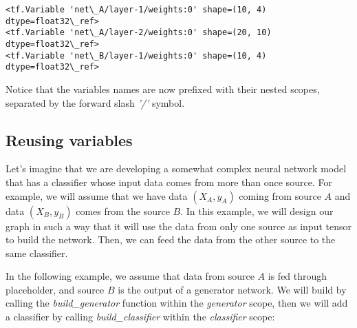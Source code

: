 \documentclass[11pt]{article}
\begin{document}
    \begin{Verbatim}[commandchars=\\\{\}]
<tf.Variable 'net\_A/layer-1/weights:0' shape=(10, 4) dtype=float32\_ref>
<tf.Variable 'net\_A/layer-2/weights:0' shape=(20, 10) dtype=float32\_ref>
<tf.Variable 'net\_B/layer-1/weights:0' shape=(10, 4) dtype=float32\_ref>

    \end{Verbatim}

    Notice that the variables names are now prefixed with their nested
scopes, separated by the forward slash \emph{'/'} symbol.

    \subsection{Reusing variables}\label{reusing-variables}

    Let's imagine that we are developing a somewhat complex neural network
model that has a classifier whose input data comes from more than once
source. For example, we will assume that we have data \((X_A, y_A)\)
coming from source \(A\) and data \((X_B, y_B)\) comes from the source
\(B\). In this example, we will design our graph in such a way that it
will use the data from only one source as input tensor to build the
network. Then, we can feed the data from the other source to the same
classifier.

In the following example, we assume that data from source \(A\) is fed
through placeholder, and source \(B\) is the output of a generator
network. We will build by calling the \emph{build\_generator} function
within the \emph{generator} scope, then we will add a classifier by
calling \emph{build\_classifier} within the \emph{classifier} scope:
\end{document}

